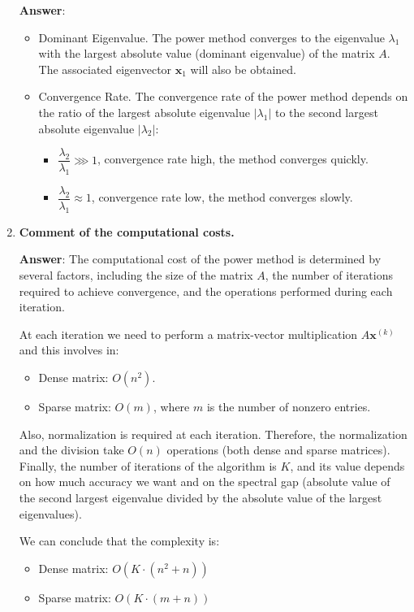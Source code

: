 \begin{enumerate}[label=\textcolor{Green3}{\textbf{\arabic*.}}]
    \textbf{Answer}:
    \begin{itemize}
        \item Dominant Eigenvalue. The power method converges to the eigenvalue $\lambda_{1}$ with the largest absolute value (dominant eigenvalue) of the matrix $A$. The associated eigenvector $\mathbf{x}_{1}$ will also be obtained.
        \item Convergence Rate. The convergence rate of the power method depends on the ratio of the largest absolute eigenvalue $\left|\lambda_{1}\right|$ to the second largest absolute eigenvalue $\left|\lambda_{2}\right|$:
        \begin{itemize}
            \item $\dfrac{\lambda_{2}}{\lambda_{1}} \ggg 1$, convergence rate high, the method converges quickly.
            \item $\dfrac{\lambda_{2}}{\lambda_{1}} \approx 1$, convergence rate low, the method converges slowly.
        \end{itemize}
    \end{itemize}




    \item \textcolor{Green3}{\textbf{%
        Comment of the computational costs.
    }}

    \textbf{Answer}: The computational cost of the power method is determined by several factors, including the size of the matrix \( A \), the number of iterations required to achieve convergence, and the operations performed during each iteration.

    At each iteration we need to perform a matrix-vector multiplication $A \mathbf{x}^{(k)}$ and this involves in:
    \begin{itemize}
        \item Dense matrix: $O\left(n^{2}\right)$.
        \item Sparse matrix: $O\left(m\right)$, where $m$ is the number of nonzero entries.
    \end{itemize}
    Also, normalization is required at each iteration. Therefore, the normalization and the division take $O\left(n\right)$ operations (both dense and sparse matrices). Finally, the number of iterations of the algorithm is $K$, and its value depends on how much accuracy we want and on the spectral gap (absolute value of the second largest eigenvalue divided by the absolute value of the largest eigenvalues).

    We can conclude that the complexity is:
    \begin{itemize}
        \item Dense matrix: $O\left(K \cdot \left(n^{2} + n\right)\right)$
        \item Sparse matrix: $O\left(K \cdot \left(m + n\right)\right)$
    \end{itemize}
\end{enumerate}


